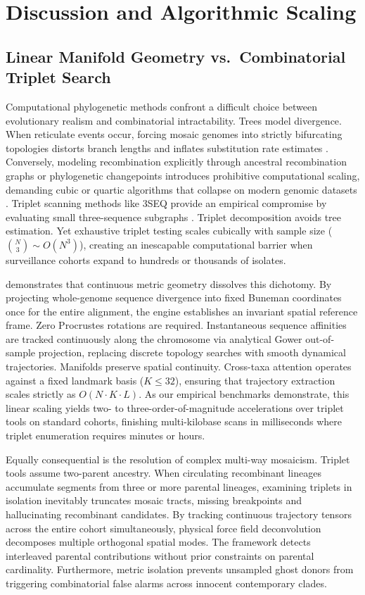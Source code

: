 \section{Discussion and Algorithmic Scaling}
\label{sec:discussion}

\subsection{Linear Manifold Geometry vs.\ Combinatorial Triplet Search}
\label{subsec:discussion_scaling}

Computational phylogenetic methods confront a difficult choice between evolutionary realism and combinatorial intractability.
Trees model divergence.
When reticulate events occur, forcing mosaic genomes into strictly bifurcating topologies distorts branch lengths and inflates substitution rate estimates \citep{schierup2000consequences}.
Conversely, modeling recombination explicitly through ancestral recombination graphs or phylogenetic changepoints introduces prohibitive computational scaling, demanding cubic or quartic algorithms that collapse on modern genomic datasets \citep{minh2020iqtree2}.
Triplet scanning methods like 3SEQ provide an empirical compromise by evaluating small three-sequence subgraphs \citep{boni2007exact}.
Triplet decomposition avoids tree estimation.
Yet exhaustive triplet testing scales cubically with sample size ($\binom{N}{3} \sim O(N^3)$), creating an inescapable computational barrier when surveillance cohorts expand to hundreds or thousands of isolates.

\RhizAeon demonstrates that continuous metric geometry dissolves this dichotomy.
By projecting whole-genome sequence divergence into fixed Buneman coordinates once for the entire alignment, the engine establishes an invariant spatial reference frame.
Zero Procrustes rotations are required.
Instantaneous sequence affinities are tracked continuously along the chromosome via analytical Gower out-of-sample projection, replacing discrete topology searches with smooth dynamical trajectories.
Manifolds preserve spatial continuity.
Cross-taxa attention operates against a fixed landmark basis ($K \le 32$), ensuring that trajectory extraction scales strictly as $O(N \cdot K \cdot L)$.
As our empirical benchmarks demonstrate, this linear scaling yields two- to three-order-of-magnitude accelerations over triplet tools on standard cohorts, finishing multi-kilobase scans in milliseconds where triplet enumeration requires minutes or hours.

Equally consequential is the resolution of complex multi-way mosaicism.
Triplet tools assume two-parent ancestry.
When circulating recombinant lineages accumulate segments from three or more parental lineages, examining triplets in isolation inevitably truncates mosaic tracts, missing breakpoints and hallucinating recombinant candidates.
By tracking continuous trajectory tensors across the entire cohort simultaneously, physical force field deconvolution decomposes multiple orthogonal spatial modes.
The framework detects interleaved parental contributions without prior constraints on parental cardinality.
Furthermore, metric isolation prevents unsampled ghost donors from triggering combinatorial false alarms across innocent contemporary clades.

